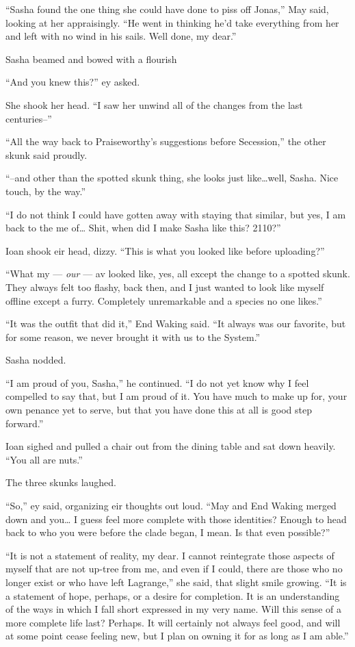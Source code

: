 ``Sasha found the one thing she could have done to piss off Jonas,'' May said, looking at her appraisingly. ``He went in thinking he'd take everything from her and left with no wind in his sails. Well done, my dear.''

Sasha beamed and bowed with a flourish

``And you knew this?'' ey asked.

She shook her head. ``I saw her unwind all of the changes from the last centuries--''

``All the way back to Praiseworthy's suggestions before Secession,'' the other skunk said proudly.

``--and other than the spotted skunk thing, she looks just like\ldots well, Sasha. Nice touch, by the way.''

``I do not think I could have gotten away with staying that similar, but yes, I am back to the me of\ldots{} Shit, when did I make Sasha like this? 2110?''

Ioan shook eir head, dizzy. ``This is what you looked like before uploading?''

``What my — \emph{our} — av looked like, yes, all except the change to a spotted skunk. They always felt too flashy, back then, and I just wanted to look like myself offline except a furry. Completely unremarkable and a species no one likes.''

``It was the outfit that did it,'' End Waking said. ``It always was our favorite, but for some reason, we never brought it with us to the System.''

Sasha nodded.

``I am proud of you, Sasha,'' he continued. ``I do not yet know why I feel compelled to say that, but I am proud of it. You have much to make up for, your own penance yet to serve, but that you have done this at all is good step forward.''

Ioan sighed and pulled a chair out from the dining table and sat down heavily. ``You all are nuts.''

The three skunks laughed.

``So,'' ey said, organizing eir thoughts out loud. ``May and End Waking merged down and you\ldots{} I guess feel more complete with those identities? Enough to head back to who you were before the clade began, I mean. Is that even possible?''

``It is not a statement of reality, my dear. I cannot reintegrate those aspects of myself that are not up-tree from me, and even if I could, there are those who no longer exist or who have left Lagrange,'' she said, that slight smile growing. ``It is a statement of hope, perhaps, or a desire for completion. It is an understanding of the ways in which I fall short expressed in my very name. Will this sense of a more complete life last? Perhaps. It will certainly not always feel good, and will at some point cease feeling new, but I plan on owning it for as long as I am able.''

